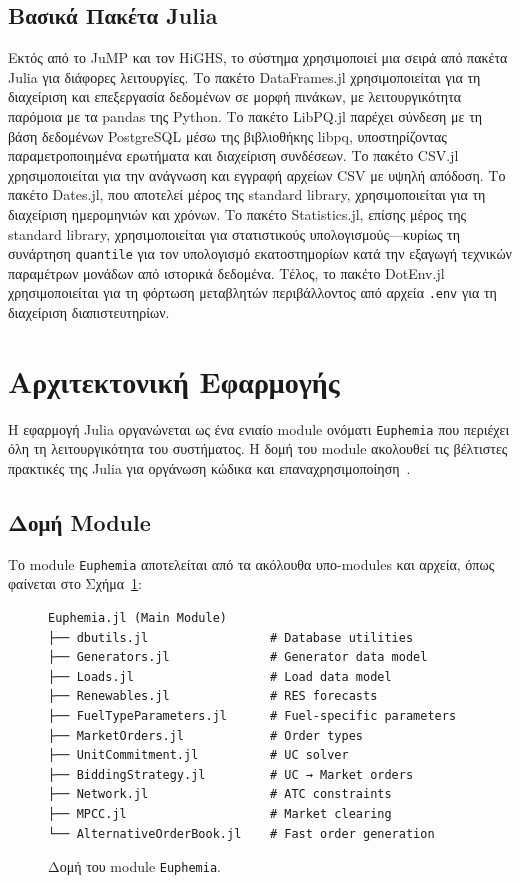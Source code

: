 \subsection{Βασικά Πακέτα Julia}
\label{subsec:julia-packages}

Εκτός από το JuMP και τον HiGHS, το σύστημα χρησιμοποιεί μια σειρά από πακέτα Julia για διάφορες λειτουργίες. Το πακέτο DataFrames.jl χρησιμοποιείται για τη διαχείριση και επεξεργασία δεδομένων σε μορφή πινάκων, με λειτουργικότητα παρόμοια με τα pandas της Python. Το πακέτο LibPQ.jl παρέχει σύνδεση με τη βάση δεδομένων PostgreSQL μέσω της βιβλιοθήκης libpq, υποστηρίζοντας παραμετροποιημένα ερωτήματα και διαχείριση συνδέσεων. Το πακέτο CSV.jl χρησιμοποιείται για την ανάγνωση και εγγραφή αρχείων CSV με υψηλή απόδοση. Το πακέτο Dates.jl, που αποτελεί μέρος της standard library, χρησιμοποιείται για τη διαχείριση ημερομηνιών και χρόνων. Το πακέτο Statistics.jl, επίσης μέρος της standard library, χρησιμοποιείται για στατιστικούς υπολογισμούς---κυρίως τη συνάρτηση \texttt{quantile} για τον υπολογισμό εκατοστημορίων κατά την εξαγωγή τεχνικών παραμέτρων μονάδων από ιστορικά δεδομένα. Τέλος, το πακέτο DotEnv.jl χρησιμοποιείται για τη φόρτωση μεταβλητών περιβάλλοντος από αρχεία \texttt{.env} για τη διαχείριση διαπιστευτηρίων.


\section{Αρχιτεκτονική Εφαρμογής}
\label{sec:application-architecture}

Η εφαρμογή Julia οργανώνεται ως ένα ενιαίο module ονόματι \texttt{Euphemia} που περιέχει όλη τη λειτουργικότητα του συστήματος. Η δομή του module ακολουθεί τις βέλτιστες πρακτικές της Julia για οργάνωση κώδικα και επαναχρησιμοποίηση~\cite{julia-docs}.

\subsection{Δομή Module}
\label{subsec:module-structure}

Το module \texttt{Euphemia} αποτελείται από τα ακόλουθα υπο-modules και αρχεία, όπως φαίνεται στο Σχήμα~\ref{fig:module-structure}:

\begin{figure}[htbp]
\centering
\begin{verbatim}
Euphemia.jl (Main Module)
├── dbutils.jl                 # Database utilities
├── Generators.jl              # Generator data model
├── Loads.jl                   # Load data model
├── Renewables.jl              # RES forecasts
├── FuelTypeParameters.jl      # Fuel-specific parameters
├── MarketOrders.jl            # Order types
├── UnitCommitment.jl          # UC solver
├── BiddingStrategy.jl         # UC → Market orders
├── Network.jl                 # ATC constraints
├── MPCC.jl                    # Market clearing
└── AlternativeOrderBook.jl    # Fast order generation
\end{verbatim}
\caption{Δομή του module \texttt{Euphemia}.}
\label{fig:module-structure}
\end{figure}

